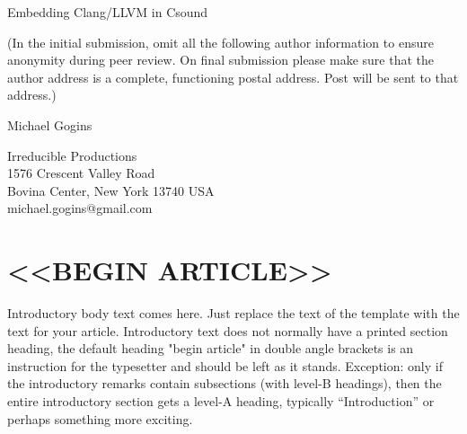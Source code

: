 \documentclass[letterpaper, 12pt]{article}
\begin{document}
{\cmjTitle Embedding Clang/LLVM in Csound}
\vspace*{24pt}

(In the initial submission, omit all the following author information to ensure anonymity during peer review.
On final submission please make sure that the author address is a complete, functioning postal address.
Post will be sent to that address.)

{\cmjAuthor Michael Gogins}	%
 
\begin{cmjAuthorAddress}
	Irreducible Productions\\
	1576 Crescent Valley Road\\
	Bovina Center, New York 13740 USA\\		%
	michael.gogins@gmail.com
\end{cmjAuthorAddress}


\begin{abstract}
I present new opcodes for the Csound computer music system that embed 
the Clang/LLVM on-request compiler (ORC). C or C++ source code may be 
embedded in a regular Csound orchestra file, compiled by the \texttt{clang\_compile} opcode, and invoked during performance by the 
\texttt{clang\_invoke} opcode. Uses include prototyping DSP code in C/C++, 
writing new opcodes, algorithmic composition, using external dynamic link libraries, 
creating native user interfaces for Csound 
orchestras, and more. The technology and patterns implemented 
here could be adapted for use in other computer music systems that are 
written in C or C++. 
\end{abstract}

\section{<<BEGIN ARTICLE>>}
Introductory body text comes here. 
Just replace the text of the template with the text for your article.
Introductory text does not normally have a printed section heading, the default heading "begin article" in double angle brackets is an instruction for the typesetter and should be left as it stands.
Exception: only if the introductory remarks contain subsections (with level-B headings), then the entire introductory section gets a level-A heading, typically ``Introduction'' or perhaps something more exciting.
\end{document}

